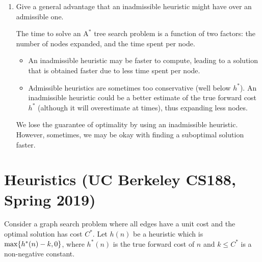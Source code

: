 \documentclass[11pt, a4paper]{article}
\def\Astar{$\text{A}^*$}
\begin{document}
\begin{enumerate}
    \item Give a general advantage that an inadmissible heuristic might have over an admissible one.

    \begin{solution}
        The time to solve an \Astar{} tree search problem is a function of two factors: the number of nodes expanded, and the time spent per node.
        \begin{itemize}
            \item An inadmissible heuristic may be faster to compute, leading to a solution that is obtained faster due to less time spent per node.
            \item Admissible heuristics are sometimes too conservative (well below $h^*$). An inadmissible heuristic could be a better estimate of the true forward cost $h^*$ (although it will overestimate at times), thus expanding less nodes.
        \end{itemize}
        We lose the guarantee of optimality by using an inadmissible heuristic. However, sometimes, we may be okay with finding a suboptimal solution faster.
    \end{solution}
\end{enumerate}

\newpage

\section{Heuristics (UC Berkeley CS188, Spring 2019)}

Consider a graph search problem where all edges have a unit cost and the optimal solution has cost $C^*$. Let $h(n)$ be a heuristic which is $\max \{h^*(n) - k, 0\}$, where $h^*(n)$ is the true forward cost of $n$ and $k \leq C^*$ is a non-negative constant.
\end{document}
